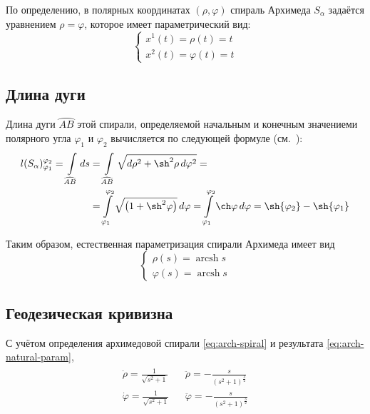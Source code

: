 \documentclass{article}
\numberwithin{equation}{section}
\renewcommand{\phi}{\varphi}
\DeclareMathOperator{\arcsh}{arcsh}
\providecommand{\arc}[1]{\wideparen{#1}}
\begin{document}
По определению, в полярных координатах $(\rho, \phi)$ спираль Архимеда
$S_\alpha$ задаётся уравнением $\rho = \phi$, которое имеет
параметрический вид:
\begin{equation}\label{eq:arch-spiral}
  \begin{cases}
    x^1(t) = \rho(t) = t \\
    x^2(t) = \phi(t) = t
  \end{cases}
\end{equation}

\subsection{Длина дуги}

Длина дуги $\arc{AB}$ этой спирали, определяемой начальным и конечным значениеми
полярного угла $\phi_1$ и $\phi_2$ вычисляется по следующей формуле
(см. \cite{dubrovin98}):
\begin{equation}\label{eq:arch-length}
  \begin{split}
    l(S_\alpha)^{\phi_2}_{\phi_1} =
    \int \limits_{\arc{AB}}{ds} &=
    \int \limits_{\arc{AB}}{\sqrt{d\rho^2+\sh^2\rho\,d\phi^2}} =\\
    &=\int \limits^{\phi_2}_{\phi_1}{\sqrt{\left ( 1 + \sh^2\phi \right )}}\,d\phi =
    \int \limits^{\phi_2}_{\phi_1}\ch\phi\,d\phi =
    \sh{\phi_2} - \sh{\phi_1}
  \end{split}
\end{equation}

Таким образом, естественная параметризация спирали Архимеда имеет вид
\begin{equation}\label{eq:arch-natural-param}
  \begin{cases}
    \rho(s) = \arcsh{s} \\
    \phi(s) = \arcsh{s}
  \end{cases}
\end{equation}

\subsection{Геодезическая кривизна}

С учётом определения архимедовой спирали \eqref{eq:arch-spiral} и
результата \eqref{eq:arch-natural-param},
\begin{gather}
  \begin{align*}
    \dot{\rho} = \frac{1}{\sqrt{s^2+1}} && \ddot{\rho} = -\frac{s}{(s^2+1)^{\frac{3}{2}}}\\
    \dot{\phi} = \frac{1}{\sqrt{s^2+1}} && \ddot{\phi} = -\frac{s}{(s^2+1)^{\frac{3}{2}}}
  \end{align*}
\end{gather}
\end{document}
